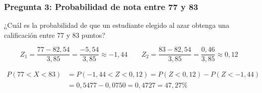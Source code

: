 
\subsubsection{Pregunta 3: Probabilidad de nota entre 77 y 83}

¿Cuál es la probabilidad de que un estudiante elegido al azar obtenga una calificación entre 77
y 83 puntos?

\begin{equation*}
  Z_1 = \frac{77 - 82{,}54}{3{,}85} = \frac{-5{,}54}{3{,}85} \approx -1{,}44
  \qquad
  Z_2 = \frac{83 - 82{,}54}{3{,}85} = \frac{0{,}46}{3{,}85} \approx 0{,}12
\end{equation*}

\Respuesta
\begin{equation*}
  \begin{split}
    P(77 < X < 83) &= P(-1{,}44 < Z < 0{,}12) = P(Z < 0{,}12) - P(Z < -1{,}44) \\
                    &= 0{,}5477 - 0{,}0750 = 0{,}4727 = 47{,}27\%
  \end{split}
\end{equation*}


